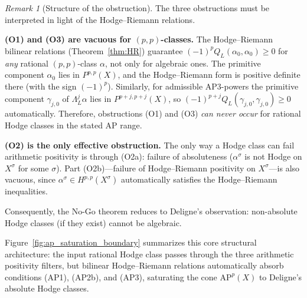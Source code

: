 \documentclass[aps,prd,twocolumn,superscriptaddress,nofootinbib]{revtex4-2}
\theoremstyle{definition}
\theoremstyle{remark}
\newtheorem{remark}[theorem]{Remark}
\begin{document}
\begin{remark}[Structure of the obstruction]
\label{rem:obstruction_structure}
The three obstructions must be interpreted in light of the Hodge--Riemann relations.

\textbf{(O1) and (O3) are vacuous for $(p,p)$-classes.} The Hodge--Riemann bilinear relations (Theorem~\ref{thm:HR}) guarantee $(-1)^p Q_L(\alpha_0, \alpha_0) \geq 0$ for \textit{any} rational $(p,p)$-class $\alpha$, not only for algebraic ones. The primitive component $\alpha_0$ lies in $P^{p,p}(X)$, and the Hodge--Riemann form is positive definite there (with the sign $(-1)^p$). Similarly, for admissible AP3-powers the primitive component $\gamma_{j,0}$ of $\Lambda_L^j \alpha$ lies in $P^{p+j,p+j}(X)$, so $(-1)^{p+j} Q_L(\gamma_{j,0}, \gamma_{j,0}) \geq 0$ automatically. Therefore, obstructions (O1) and (O3) \textit{can never occur} for rational Hodge classes in the stated AP range.

\textbf{(O2) is the only effective obstruction.} The only way a Hodge class can fail arithmetic positivity is through (O2a): failure of absoluteness ($\alpha^\sigma$ is not Hodge on $X^\sigma$ for some $\sigma$). Part (O2b)---failure of Hodge--Riemann positivity on $X^\sigma$---is also vacuous, since $\alpha^\sigma \in H^{p,p}(X^\sigma)$ automatically satisfies the Hodge--Riemann inequalities.

Consequently, the No-Go theorem reduces to Deligne's observation: non-absolute Hodge classes (if they exist) cannot be algebraic.
\end{remark}

Figure~\ref{fig:ap_saturation_boundary} summarizes this core structural architecture: the input rational Hodge class passes through the three arithmetic positivity filters, but bilinear Hodge--Riemann relations automatically absorb conditions (AP1), (AP2b), and (AP3), saturating the cone $\mathrm{AP}^p(X)$ to Deligne's absolute Hodge classes.
\end{document}
